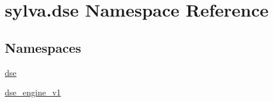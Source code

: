 \hypertarget{namespacesylva_1_1dse}{}\section{sylva.\+dse Namespace Reference}
\label{namespacesylva_1_1dse}
\subsection*{Namespaces}
\begin{DoxyCompactItemize}
\item 
 \hyperlink{namespacesylva_1_1dse_1_1dse}{dse}
\item 
 \hyperlink{namespacesylva_1_1dse_1_1dse__engine__v1}{dse\+\_\+engine\+\_\+v1}
\end{DoxyCompactItemize}
